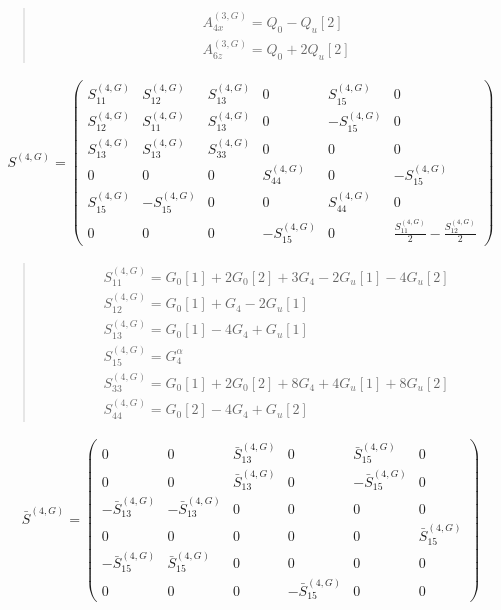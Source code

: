 \documentclass[fleqn,10pt]{jsarticle}
\begin{document}
\begin{quote}
\begin{align*}
& A^{(3,G)}_{4x} = Q_{0} - Q_{u}[2] \\
& A^{(3,G)}_{6z} = Q_{0} + 2 Q_{u}[2]
\end{align*}
\end{quote}
\begin{align*}
S^{(4,G)} = \begin{pmatrix} S^{(4,G)}_{11} & S^{(4,G)}_{12} & S^{(4,G)}_{13} & 0 & S^{(4,G)}_{15} & 0 \\ S^{(4,G)}_{12} & S^{(4,G)}_{11} & S^{(4,G)}_{13} & 0 & - S^{(4,G)}_{15} & 0 \\ S^{(4,G)}_{13} & S^{(4,G)}_{13} & S^{(4,G)}_{33} & 0 & 0 & 0 \\ 0 & 0 & 0 & S^{(4,G)}_{44} & 0 & - S^{(4,G)}_{15} \\ S^{(4,G)}_{15} & - S^{(4,G)}_{15} & 0 & 0 & S^{(4,G)}_{44} & 0 \\ 0 & 0 & 0 & - S^{(4,G)}_{15} & 0 & \frac{S^{(4,G)}_{11}}{2} - \frac{S^{(4,G)}_{12}}{2} \end{pmatrix}
\end{align*}
\begin{quote}
\begin{align*}
& S^{(4,G)}_{11} = G_{0}[1] + 2 G_{0}[2] + 3 G_{4} - 2 G_{u}[1] - 4 G_{u}[2] \\
& S^{(4,G)}_{12} = G_{0}[1] + G_{4} - 2 G_{u}[1] \\
& S^{(4,G)}_{13} = G_{0}[1] - 4 G_{4} + G_{u}[1] \\
& S^{(4,G)}_{15} = G_{4}^{\alpha} \\
& S^{(4,G)}_{33} = G_{0}[1] + 2 G_{0}[2] + 8 G_{4} + 4 G_{u}[1] + 8 G_{u}[2] \\
& S^{(4,G)}_{44} = G_{0}[2] - 4 G_{4} + G_{u}[2]
\end{align*}
\end{quote}
\begin{align*}
\bar{S}^{(4,G)} = \begin{pmatrix} 0 & 0 & \bar{S}^{(4,G)}_{13} & 0 & \bar{S}^{(4,G)}_{15} & 0 \\ 0 & 0 & \bar{S}^{(4,G)}_{13} & 0 & - \bar{S}^{(4,G)}_{15} & 0 \\ - \bar{S}^{(4,G)}_{13} & - \bar{S}^{(4,G)}_{13} & 0 & 0 & 0 & 0 \\ 0 & 0 & 0 & 0 & 0 & \bar{S}^{(4,G)}_{15} \\ - \bar{S}^{(4,G)}_{15} & \bar{S}^{(4,G)}_{15} & 0 & 0 & 0 & 0 \\ 0 & 0 & 0 & - \bar{S}^{(4,G)}_{15} & 0 & 0 \end{pmatrix}
\end{align*}
\end{document}
